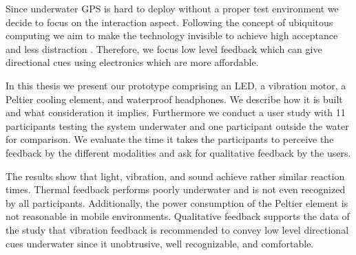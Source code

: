 Since underwater GPS is hard to deploy without a proper test environment we decide to focus on the interaction aspect.
Following the concept of ubiquitous computing we aim to make the technology invisible to achieve high acceptance and less distraction \citep{Weiser:1993:CSI:159544.159617}.
Therefore, we focus low level feedback which can give directional cues using electronics which are more affordable.

In this thesis we present our prototype comprising an LED, a vibration motor, a Peltier cooling element, and waterproof headphones.
We describe how it is built and what consideration it implies.
Furthermore we conduct a user study with 11 participants testing the system underwater and one participant outside the water for comparison.
We evaluate the time it takes the participants to perceive the feedback by the different modalities and ask for qualitative feedback by the users.

The results show that light, vibration, and sound achieve rather similar reaction times.
Thermal feedback performs poorly underwater and is not even recognized by all participants.
Additionally, the power consumption of the Peltier element is not reasonable in mobile environments.
Qualitative feedback supports the data of the study that vibration feedback is recommended to convey low level directional cues underwater since it unobtrusive, well recognizable, and comfortable.









